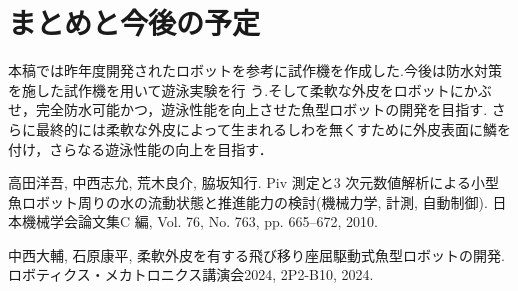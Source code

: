 \documentclass{jarticle}
\begin{document}
\section{まとめと今後の予定}

本稿では昨年度開発されたロボットを参考に試作機を作成した.今後は防水対策を施した試作機を用いて遊泳実験を行
う.そして柔軟な外皮をロボットにかぶせ，完全防水可能かつ，遊泳性能を向上させた魚型ロボットの開発を目指す.
さらに最終的には柔軟な外皮によって生まれるしわを無くすために外皮表面に鱗を付け，さらなる遊泳性能の向上を目指す．



% 
% 


\begin{thebibliography}{99}

   高田洋吾, 中西志允, 荒木良介, 脇坂知行. Piv 測定と3 次元数値解析による小型魚ロボット周りの水の流動状態と推進能力の検討(機械力学, 計測, 自動制御). 日本機械学会論文集C 編, Vol. 76, No. 763, pp. 665–672, 2010.

   中西大輔, 石原康平, 柔軟外皮を有する飛び移り座屈駆動式魚型ロボットの開発. ロボティクス・メカトロニクス講演会2024, 2P2-B10, 2024.

\end{thebibliography}
\end{document}
